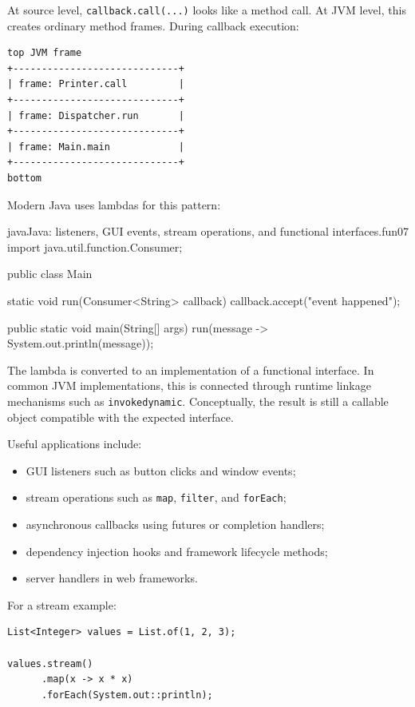 \documentclass[a4paper,twoside]{report}
\begin{document}
At source level, \texttt{callback.call(...)} looks like a method call. At JVM level, this creates ordinary method frames. During callback execution:

\begin{verbatim}
top JVM frame
+-----------------------------+
| frame: Printer.call         |
+-----------------------------+
| frame: Dispatcher.run       |
+-----------------------------+
| frame: Main.main            |
+-----------------------------+
bottom
\end{verbatim}

Modern Java uses lambdas for this pattern:

\begin{codebox}[]{java}{Java: listeners, GUI events, stream operations, and functional interfaces.}{fun07}
import java.util.function.Consumer;

public class Main {
    static void run(Consumer<String> callback) {
        callback.accept("event happened");
    }

    public static void main(String[] args) {
        run(message -> System.out.println(message));
    }
}
\end{codebox}


The lambda is converted to an implementation of a functional interface. In common JVM implementations, this is connected through runtime linkage mechanisms such as \texttt{invokedynamic}. Conceptually, the result is still a callable object compatible with the expected interface.

Useful applications include:

\begin{itemize}
    \item GUI listeners such as button clicks and window events;
    \item stream operations such as \texttt{map}, \texttt{filter}, and \texttt{forEach};
    \item asynchronous callbacks using futures or completion handlers;
    \item dependency injection hooks and framework lifecycle methods;
    \item server handlers in web frameworks.
\end{itemize}

For a stream example:

\begin{verbatim}
List<Integer> values = List.of(1, 2, 3);

values.stream()
      .map(x -> x * x)
      .forEach(System.out::println);
\end{verbatim}
\end{document}
